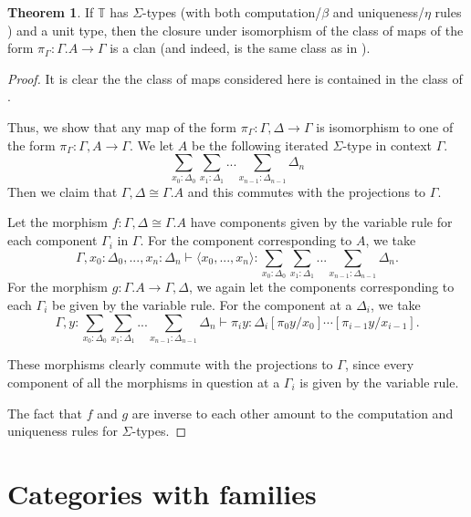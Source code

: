 \documentclass{article}
\theoremstyle{definition}
\theoremstyle{theorem}
\newtheorem{theorem}{Theorem}[section]
\newcommand{\T}{\mathbb T}
\begin{document}
\begin{theorem}
    If $\T$ has $\Sigma$-types (with both computation/$\beta$ and uniqueness/$\eta$ rules \cite{nlab}) and a unit type, then the closure under isomorphism of the class of maps of the form $\pi_\Gamma : \Gamma. A \to \Gamma$ is a clan (and indeed, is the same class as in ).
\end{theorem}
\begin{proof}
    It is clear the the class of maps considered here is contained in the class of .
    
    Thus, we show that any map of the form $\pi_\Gamma : \Gamma, \Delta \to \Gamma$ is isomorphism to one of the form $\pi_\Gamma : \Gamma, A \to \Gamma$. We let $A$ be the following iterated $\Sigma$-type in context $\Gamma$.
    \[\sum_{x_0 : \Delta_0} \sum_{x_1: \Delta_1} ... \sum_{x_{n-1}: \Delta_{n-1}} \Delta_n \]
    Then we claim that $\Gamma, \Delta \cong \Gamma.A$ and this commutes with the projections to $\Gamma$.

    Let the morphism $f: \Gamma, \Delta \cong \Gamma.A$ have components given by the variable rule for each component $\Gamma_i$ in $\Gamma$. For the component corresponding to $A$, we take 
    \[ \Gamma, x_0 : \Delta_0, ..., x_n : \Delta_n \vdash \langle x_0, ..., x_n \rangle : \sum_{x_0 : \Delta_0} \sum_{x_1: \Delta_1} ... \sum_{x_{n-1}: \Delta_{n-1}} \Delta_n. \]
    For the morphism $g: \Gamma.A \to \Gamma, \Delta$, we again let the components corresponding to each $\Gamma_i$ be given by the variable rule. For the component at a $\Delta_i$, we take 
    \[ \Gamma, y : \sum_{x_0 : \Delta_0} \sum_{x_1: \Delta_1} ... \sum_{x_{n-1}: \Delta_{n-1}} \Delta_n \vdash 
    \pi_i y : \Delta_i[\pi_0 y / x_0]\cdots[\pi_{i-1} y / x_{i-1}]. \]

    These morphisms clearly commute with the projections to $\Gamma$, since every component of all the morphisms in question at a $\Gamma_i$ is given by the variable rule.

    The fact that $f$ and $g$ are inverse to each other amount to the computation and uniqueness rules for $\Sigma$-types.
\end{proof}

\section{Categories with families}
\end{document}
